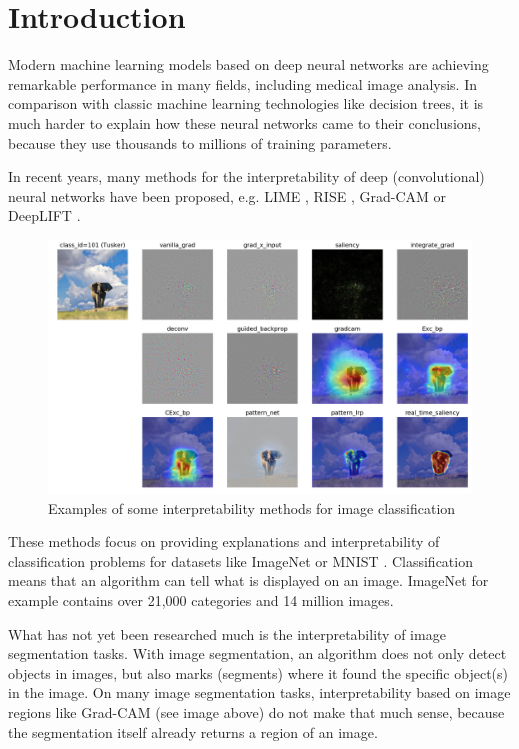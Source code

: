 \chapter{Introduction}
Modern machine learning models based on deep neural networks are achieving remarkable performance in many fields, including medical image analysis. In comparison with classic machine learning technologies like decision trees, it is much harder to explain how these neural networks came to their conclusions, because they use thousands to millions of training parameters.

In recent years, many methods for the interpretability of deep (convolutional) neural networks have been proposed, e.g. LIME \cite{ribeiro2016should}, RISE \cite{Petsiuk2018rise}, Grad-CAM \cite{selvaraju2017grad} or DeepLIFT \cite{shrikumar2017learning}.

\begin{figure}[h]
\centering
\caption{Examples of some interpretability methods for image classification \cite{visualattribution}}
\includegraphics[width=14cm]{images/tusker_saliency.png}
\end{figure}

These methods focus on providing explanations and interpretability of classification problems for datasets like ImageNet \cite{imagenet_cvpr09} or MNIST \cite{lecun-mnisthandwrittendigit-2010}. Classification means that an algorithm can tell what is displayed on an image. ImageNet for example contains over 21,000 categories and 14 million images.

What has not yet been researched much is the interpretability of image segmentation tasks. With image segmentation, an algorithm does not only detect objects in images, but also marks (segments) where it found the specific object(s) in the image. On many image segmentation tasks, interpretability based on image regions like Grad-CAM (see image above) do not make that much sense, because the segmentation itself already returns a region of an image.

